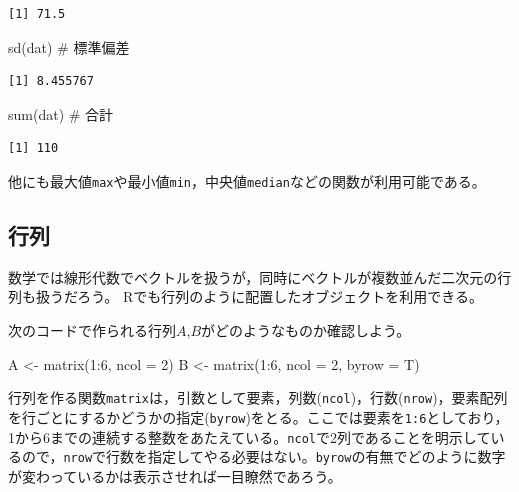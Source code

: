 \documentclass[
  a4paper,
]{ltjsbook}
\newenvironment{Shaded}{\begin{snugshade}}{\end{snugshade}}
\newcommand{\AttributeTok}[1]{\textcolor[rgb]{0.40,0.45,0.13}{#1}}
\newcommand{\CommentTok}[1]{\textcolor[rgb]{0.37,0.37,0.37}{#1}}
\newcommand{\DecValTok}[1]{\textcolor[rgb]{0.68,0.00,0.00}{#1}}
\newcommand{\FunctionTok}[1]{\textcolor[rgb]{0.28,0.35,0.67}{#1}}
\newcommand{\NormalTok}[1]{\textcolor[rgb]{0.00,0.23,0.31}{#1}}
\newcommand{\OtherTok}[1]{\textcolor[rgb]{0.00,0.23,0.31}{#1}}
\newcommand{\SpecialCharTok}[1]{\textcolor[rgb]{0.37,0.37,0.37}{#1}}
\begin{document}
\begin{verbatim}
[1] 71.5
\end{verbatim}

\begin{Shaded}
\begin{Highlighting}[]
\FunctionTok{sd}\NormalTok{(dat) }\CommentTok{\# 標準偏差}
\end{Highlighting}
\end{Shaded}

\begin{verbatim}
[1] 8.455767
\end{verbatim}

\begin{Shaded}
\begin{Highlighting}[]
\FunctionTok{sum}\NormalTok{(dat) }\CommentTok{\# 合計}
\end{Highlighting}
\end{Shaded}

\begin{verbatim}
[1] 110
\end{verbatim}

他にも最大値\texttt{max}や最小値\texttt{min}，中央値\texttt{median}などの関数が利用可能である。

\subsection{行列}\label{ux884cux5217}

数学では線形代数でベクトルを扱うが，同時にベクトルが複数並んだ二次元の行列も扱うだろう。
Rでも行列のように配置したオブジェクトを利用できる。

次のコードで作られる行列\(A\),\(B\)がどのようなものか確認しよう。

\begin{Shaded}
\begin{Highlighting}[]
\NormalTok{A }\OtherTok{\textless{}{-}} \FunctionTok{matrix}\NormalTok{(}\DecValTok{1}\SpecialCharTok{:}\DecValTok{6}\NormalTok{, }\AttributeTok{ncol =} \DecValTok{2}\NormalTok{)}
\NormalTok{B }\OtherTok{\textless{}{-}} \FunctionTok{matrix}\NormalTok{(}\DecValTok{1}\SpecialCharTok{:}\DecValTok{6}\NormalTok{, }\AttributeTok{ncol =} \DecValTok{2}\NormalTok{, }\AttributeTok{byrow =}\NormalTok{ T)}
\end{Highlighting}
\end{Shaded}

行列を作る関数\texttt{matrix}は，引数として要素，列数(\texttt{ncol})，行数(\texttt{nrow})，要素配列を行ごとにするかどうかの指定(\texttt{byrow})をとる。ここでは要素を\texttt{1:6}としており，1から6までの連続する整数をあたえている。\texttt{ncol}で2列であることを明示しているので，\texttt{nrow}で行数を指定してやる必要はない。\texttt{byrow}の有無でどのように数字が変わっているかは表示させれば一目瞭然であろう。
\end{document}

